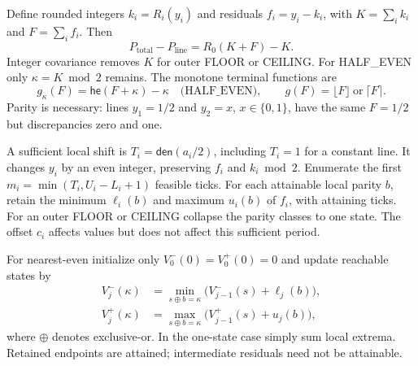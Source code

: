 \documentclass[11pt]{article}
\newcommand{\he}{\mathsf{he}}
\newcommand{\den}{\mathsf{den}}
\begin{document}
Define rounded integers $k_i=R_i(y_i)$ and residuals $f_i=y_i-k_i$, with $K=\sum_i k_i$ and $F=\sum_i f_i$. Then
\[
 P_{\mathrm{total}}-P_{\mathrm{line}}=R_0(K+F)-K.
\]
Integer covariance removes $K$ for outer FLOOR or CEILING. For HALF\_EVEN only $\kappa=K\bmod2$ remains. The monotone terminal functions are
\[
 g_\kappa(F)=\he(F+\kappa)-\kappa\quad\text{(HALF\_EVEN)},\qquad
 g(F)=\lfloor F\rfloor\ \text{or}\ \lceil F\rceil.
\]
Parity is necessary: lines $y_1=1/2$ and $y_2=x$, $x\in\{0,1\}$, have the same $F=1/2$ but discrepancies zero and one.

A sufficient local shift is $T_i=\den(a_i/2)$, including $T_i=1$ for a constant line. It changes $y_i$ by an even integer, preserving $f_i$ and $k_i\bmod2$. Enumerate the first $m_i=\min(T_i,U_i-L_i+1)$ feasible ticks. For each attainable local parity $b$, retain the minimum $\ell_i(b)$ and maximum $u_i(b)$ of $f_i$, with attaining ticks. For an outer FLOOR or CEILING collapse the parity classes to one state. The offset $c_i$ affects values but does not affect this sufficient period.

For nearest-even initialize only $V_0^-(0)=V_0^+(0)=0$ and update reachable states by
\begin{align}
 V_j^-(\kappa)&=\min_{s\oplus b=\kappa}\bigl(V_{j-1}^-(s)+\ell_j(b)\bigr),\label{eq:dpmin}\\
 V_j^+(\kappa)&=\max_{s\oplus b=\kappa}\bigl(V_{j-1}^+(s)+u_j(b)\bigr),\label{eq:dpmax}
\end{align}
where $\oplus$ denotes exclusive-or. In the one-state case simply sum local extrema. Retained endpoints are attained; intermediate residuals need not be attainable.
\end{document}
